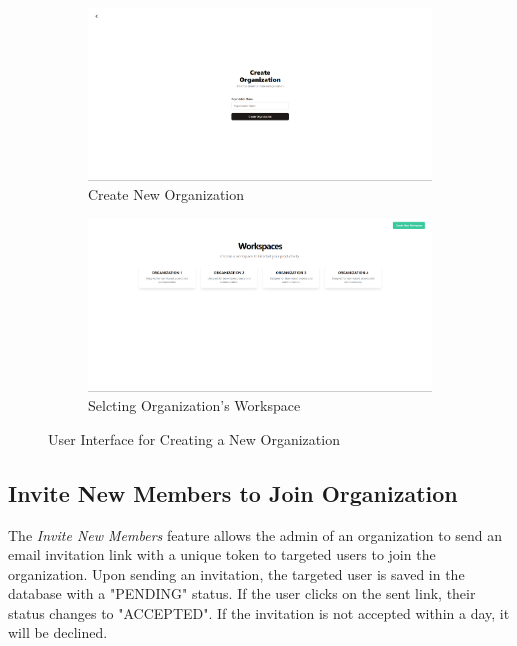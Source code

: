 \begin{figure}[ht]
	\centering
	\begin{subfigure}[b]{0.45\linewidth}
		\includegraphics[width=\linewidth]{Images/sprint2/screenshots/Screenshot 2024-06-06 004648.png}
		\caption{Create New Organization}
		\label{fig:Create New Organization}
	\end{subfigure}
	\hfill
	\begin{subfigure}[b]{0.45\linewidth}
		\includegraphics[width=\linewidth]{Images/Sprint2/screenshots/Screenshot 2024-06-06 004720.png}
		\caption{Selcting Organization's Workspace}
		\label{fig:Selcting Organization's Workspace}
	\end{subfigure}
	\caption{User Interface for Creating a New Organization}
\end{figure}

\subsection{Invite New Members to Join Organization}
The \textit{Invite New Members} feature allows the admin of an organization to send an email invitation link with a unique token to targeted users to join the organization. Upon sending an invitation, the targeted user is saved in the database with a "PENDING" status. If the user clicks on the sent link, their status changes to "ACCEPTED". If the invitation is not accepted within a day, it will be declined.

